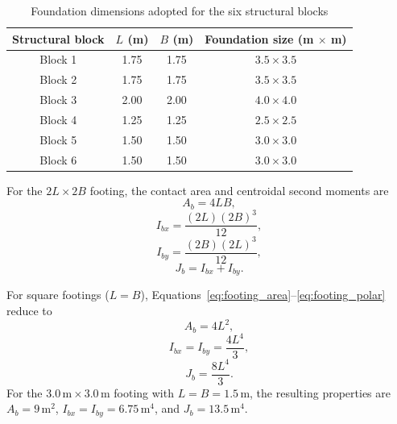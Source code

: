 \begin{table}[htbp]
\fontsize{11}{13}\selectfont\setlength{\tabcolsep}{4pt}
\centering
\caption{Foundation dimensions adopted for the six structural blocks}
\label{tab:footing_dimensions}
\begin{tabular*}{\linewidth}{@{\extracolsep{\fill}}cccc@{}}
\toprule
Structural block & $L$ (m) & $B$ (m) & Foundation size (m $\times$ m) \\
\midrule
Block 1 & 1.75 & 1.75 & $3.5\times3.5$ \\
Block 2 & 1.75 & 1.75 & $3.5\times3.5$ \\
Block 3 & 2.00 & 2.00 & $4.0\times4.0$ \\
Block 4 & 1.25 & 1.25 & $2.5\times2.5$ \\
Block 5 & 1.50 & 1.50 & $3.0\times3.0$ \\
Block 6 & 1.50 & 1.50 & $3.0\times3.0$ \\
\bottomrule
\end{tabular*}
\end{table}
\FloatBarrier

For the $2L\times2B$ footing, the contact area and centroidal second moments are
\begin{equation}
A_b=4LB,\label{eq:footing_area}
\end{equation}
\begin{equation}
I_{bx}=\frac{(2L)(2B)^3}{12},\label{eq:footing_ix}
\end{equation}
\begin{equation}
I_{by}=\frac{(2B)(2L)^3}{12},\label{eq:footing_iy}
\end{equation}
\begin{equation}
J_b=I_{bx}+I_{by}.\label{eq:footing_polar}
\end{equation}

For square footings ($L=B$), Equations~\ref{eq:footing_area}--\ref{eq:footing_polar} reduce to
\begin{equation}
A_b=4L^2,\label{eq:square_footing_area}
\end{equation}
\begin{equation}
I_{bx}=I_{by}=\frac{4L^4}{3},\label{eq:square_footing_moments}
\end{equation}
\begin{equation}
J_b=\frac{8L^4}{3}.\label{eq:square_footing_polar}
\end{equation}
For the $3.0\,\mathrm{m}\times3.0\,\mathrm{m}$ footing with $L=B=1.5\,\mathrm{m}$, the resulting properties are $A_b=9\,\mathrm{m^2}$, $I_{bx}=I_{by}=6.75\,\mathrm{m^4}$, and $J_b=13.5\,\mathrm{m^4}$.

